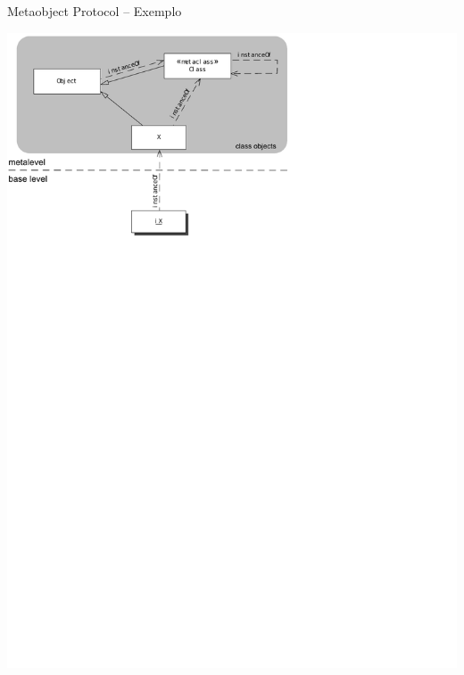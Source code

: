 \documentclass[12pt,t]{beamer}
\begin{document}
   	 \begin{frame}{Metaobject Protocol -- Exemplo}
   	 	\begin{block}{ }
 	 		\centering
 	 		\includegraphics[trim=0 535 210 0, clip=true, height=0.90\textheight]{mop.pdf}
   	 	\end{block} 
   	 \end{frame}	
\end{document}
